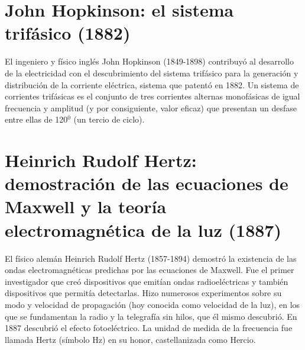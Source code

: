 \documentclass{article}
\begin{document}
\section{John Hopkinson: el sistema trifásico (1882)}

El ingeniero y físico inglés John Hopkinson (1849-1898) contribuyó al desarrollo de la electricidad con el descubrimiento del sistema trifásico para la generación y distribución de la corriente eléctrica, sistema que patentó en 1882. Un sistema de corrientes trifásicas es el conjunto de tres corrientes alternas monofásicas de igual frecuencia y amplitud (y por consiguiente, valor eficaz) que presentan un desfase entre ellas de 120$^0$ (un tercio de ciclo).


\section{Heinrich Rudolf Hertz: demostración de las ecuaciones de Maxwell y la teoría electromagnética de la luz (1887)}

El físico alemán Heinrich Rudolf Hertz (1857-1894) demostró la existencia de las ondas electromagnéticas predichas por las ecuaciones de Maxwell. Fue el primer investigador que creó dispositivos que emitían ondas radioeléctricas y también dispositivos que permitía detectarlas. Hizo numerosos experimentos sobre su modo y velocidad de propagación (hoy conocida como velocidad de la luz), en los que se fundamentan la radio y la telegrafía sin hilos, que él mismo descubrió. En 1887 descubrió el efecto fotoeléctrico. La unidad de medida de la frecuencia fue llamada Hertz (símbolo Hz) en su honor, castellanizada como Hercio.\citep{HDE}\\
\end{document}
